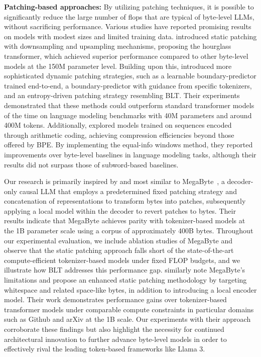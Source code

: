 \textbf{Patching-based approaches:} By utilizing patching techniques, it is possible to significantly reduce the large number of flops that are typical of byte-level LLMs, without sacrificing performance. Various studies have reported promising results on models with modest sizes and limited training data. \cite{nawrot-etal-2022-hierarchical} introduced static patching with downsampling and upsampling mechanisms, proposing the hourglass transformer, which achieved superior performance compared to other byte-level models at the 150M parameter level. Building upon this, \cite{nawrot-etal-2023-efficient} introduced more sophisticated dynamic patching strategies, such as a learnable boundary-predictor trained end-to-end, a boundary-predictor with guidance from specific tokenizers, and an entropy-driven patching strategy resembling {\textsc BLT}. Their experiments demonstrated that these methods could outperform standard transformer models of the time on language modeling benchmarks with 40M parameters and around 400M tokens. Additionally, \cite{lester2024training} explored models trained on sequences encoded through arithmetic coding, achieving compression efficiencies beyond those offered by BPE. By implementing the equal-info windows method, they reported improvements over byte-level baselines in language modeling tasks, although their results did not surpass those of subword-based baselines.

Our research is primarily inspired by and most similar to MegaByte~\citep{yu2023megabyte}, a decoder-only causal LLM that employs a predetermined fixed patching strategy and concatenation of representations to transform bytes into patches, subsequently applying a local model within the decoder to revert patches to bytes. Their results indicate that MegaByte achieves parity with tokenizer-based models at the 1B parameter scale using a corpus of approximately 400B bytes. Throughout our experimental evaluation, we include ablation studies of MegaByte and observe that the static patching approach falls short of the state-of-the-art compute-efficient tokenizer-based models under fixed FLOP budgets, and we illustrate how {\textsc BLT} addresses this performance gap. \cite{slagle2024spacebyte} similarly note MegaByte’s limitations and propose an enhanced static patching methodology by targeting whitespace and related space-like bytes, in addition to introducing a local encoder model. Their work demonstrates performance gains over tokenizer-based transformer models under comparable compute constraints in particular domains such as Github and arXiv at the 1B scale. Our experiments with their approach corroborate these findings but also highlight the necessity for continued architectural innovation to further advance byte-level models in order to effectively rival the leading token-based frameworks like Llama 3.

